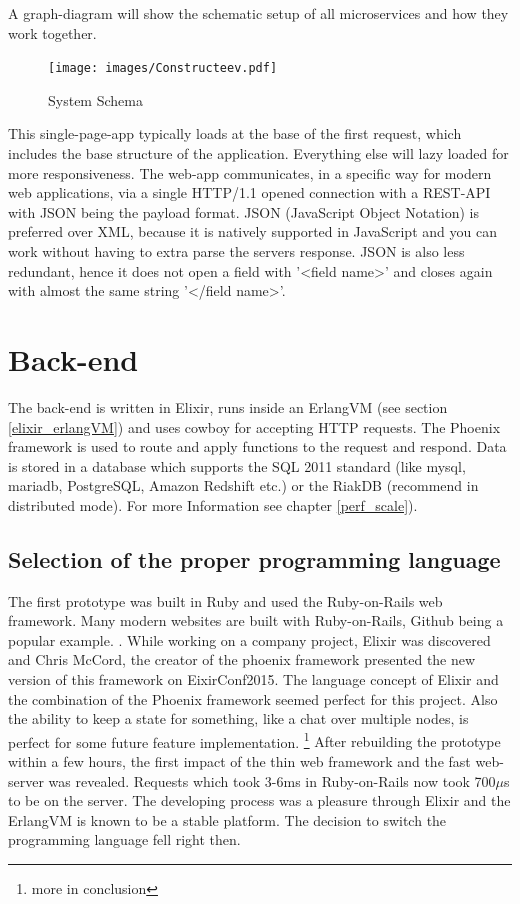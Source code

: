 A graph-diagram will show the schematic setup of all microservices and how they work together. 

\begin{figure}[!ht]
  \caption{System Schema}
  \centering
    \texttt{[image: images/Constructeev.pdf]}
\end{figure}


This single-page-app typically loads at the base of the first request, which includes the base structure of the application. Everything else will lazy loaded for more responsiveness. The web-app communicates, in a specific way for modern web applications, via a single HTTP/1.1 opened connection with a REST-API with JSON being the payload format. JSON (JavaScript Object Notation) is preferred over XML, because it is natively supported in JavaScript and you can work without having to extra parse the servers response. JSON is also less redundant, hence it does not open a field with '<field name>' and closes again with almost the same string '</field name>'.
 
\section{Back-end}
The back-end is written in Elixir, runs inside an ErlangVM (see section \ref{elixir_erlangVM}) and uses cowboy for accepting HTTP requests. The Phoenix framework is used to route and apply functions to the request and respond. Data is stored in a database which supports the SQL 2011 standard (like mysql, mariadb, PostgreSQL, Amazon Redshift etc.) or the RiakDB (recommend in distributed mode). For more Information see chapter \ref{perf_scale}).

\subsection{Selection of the proper programming language}
\textcolor{newcode}{The first prototype was built in Ruby and used the Ruby-on-Rails web framework. Many modern websites are built with Ruby-on-Rails, Github being a popular example. \cite{RORBW} \cite{DoesWhat}. While working on a company project, Elixir was discovered and Chris McCord, the creator of the phoenix framework presented the new version of this framework on EixirConf2015.
The language concept of Elixir and the combination of the Phoenix framework seemed perfect for this project. Also the ability to keep a state for something, like a chat over multiple nodes, is perfect for some future feature implementation. \footnote{more in conclusion}}
\textcolor{newcode}{
After rebuilding the prototype within a few hours, the first impact of the thin web framework and the fast web-server was revealed. Requests which took 3-6ms in Ruby-on-Rails now took 700$\mu$s to be on the server.
The developing process was a pleasure through Elixir and the ErlangVM is known to be a stable platform. The decision to switch the programming language fell right then.}

